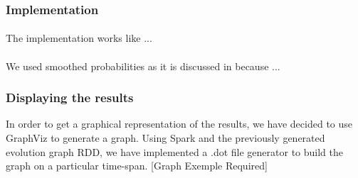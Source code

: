 \subsubsection{Implementation}
\label{sec:EvoGraImp}
\paragraph{}
The implementation works like ...

\paragraph{}
We used smoothed probabilities as it is discussed in \cite{de2010grammatical} because ... 


\subsubsection{Displaying the results}
In order to get a graphical representation of the results, we have decided to use GraphViz to generate a graph. Using Spark and the previously generated evolution graph RDD, we have implemented a .dot file generator to build the graph on a particular time-span.
[Graph Exemple Required]
